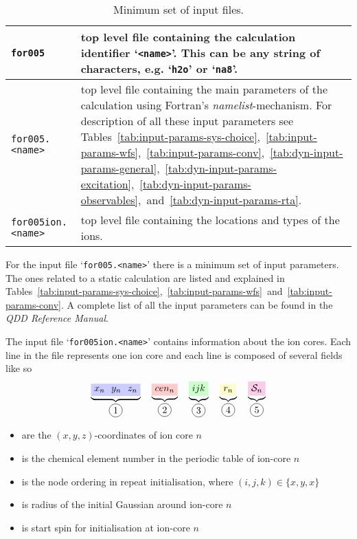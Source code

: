 \documentclass[11pt,a4paper]{article}
\begin{document}
		\begin{table}[t]
			\caption{Minimum set of input files.}\label{tab:input-files}
			\begin{tabular}{|p{3.5cm}|p{11.2cm}|}
				\hline
				\texttt{for005} & top level file containing the calculation identifier `\texttt{<name>}'. This can be any string of characters, e.g. `\texttt{h2o}' or `\texttt{na8}'. \\
			  	\hline
			  	\texttt{for005.<name>} & top level file containing the main parameters of the calculation using Fortran's \textit{namelist}-mechanism. For description of all these input parameters see Tables~\ref{tab:input-params-sys-choice},~\ref{tab:input-params-wfs},~\ref{tab:input-params-conv},~\ref{tab:dyn-input-params-general},~\ref{tab:dyn-input-params-excitation},~\ref{tab:dyn-input-params-observables},~and~\ref{tab:dyn-input-params-rta}.\\
			  	\hline
			  	\texttt{for005ion.<name>} & top level file containing the locations and types of the ions.\\
			 	\hline
			\end{tabular}
		\end{table}
		
		For the input file `\texttt{for005.<name>}' there is a minimum set of input parameters. The ones related to a static calculation are listed and explained in Tables~\ref{tab:input-params-sys-choice},~\ref{tab:input-params-wfs}~and~\ref{tab:input-params-conv}. A complete list of all the input parameters can be found in the \textit{QDD Reference Manual}.
		
		The input file `\texttt{for005ion.<name>}' contains information about the ion cores. Each line in the file represents one ion core and each line is composed of several fields like so
		\begin{align*}
			\underbrace{\tikz[baseline]{\node[fill=blue!20,anchor=base]{$x_n\:\:\: y_n\:\:\: z_n$};}}_{\circled{1}}\quad
			\underbrace{\tikz[baseline]{\node[fill=red!20,anchor=base]{$cen_n$};}}_{\circled{2}}\quad
			\underbrace{\tikz[baseline]{\node[fill=green!20,anchor=base]{$ijk$};}}_{\circled{3}}\quad
			\underbrace{\tikz[baseline]{\node[fill=yellow!20,anchor=base]{$r_n$};}}_{\circled{4}}\quad
			\underbrace{\tikz[baseline]{\node[fill=magenta!20,anchor=base]{$\mathcal{S}_n$};}}_{\circled{5}}
		\end{align*}
		\begin{itemize}
			\item[\circled{1}] are the $(x,y,z)$-coordinates of ion core $n$
			\item[\circled{2}] is the chemical element number in the periodic table of ion-core $n$
			\item[\circled{3}] is the node ordering in repeat initialisation, where $(i,j,k)\in\{x,y,x\}$
			\item[\circled{4}] is radius of the initial Gaussian around ion-core $n$
			\item[\circled{5}] is start spin for initialisation at ion-core $n$
		\end{itemize}\newpage
\end{document}

